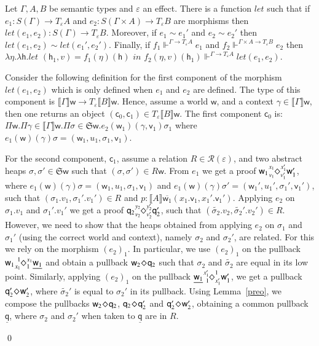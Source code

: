 \documentclass[orivec]{llncs}
\newcommand{\sq}[4]{\tensor*[^{#1}_{#2}]{\Diamond}{^{#3}_{#4}}}
\newcommand{\und}[1]{\underline{#1}}
\newcommand{\eff}{\varepsilon}
\newcommand{\sem}[1]{\ensuremath{\llbracket {#1} \rrbracket}}
\renewenvironment{proof}{\vspace{-1mm} \noindent {\bf Proof}\quad}{\qed}
\newcommand\w{\ensuremath{\mathsf{w}}\xspace}
\newcommand\q{\ensuremath{\mathsf{q}}\xspace}
\newcommand\heap{\ensuremath{\mathsf{h}}\xspace}
\newcommand{\Astores}{\mathfrak{S}}
\newcommand\val{\ensuremath{\mathsf{v}}\xspace}
\newcommand\vval{\ensuremath{v}\xspace}
\newcommand\cval{\ensuremath{\mathsf{c}}\xspace}
\newcommand\Rscr{\ensuremath{\mathcal{R}}\xspace}
\begin{document}
\begin{lemma}[let]
Let $\Gamma,A,B$ be semantic types and $\eff$ an effect. 
There is a function $\textit{let}$ such that if $e_1:S(\Gamma)\rightarrow
T_\eff A$ and $e_2:S(\Gamma\times A)\rightarrow T_\eff B$ are morphisms
then $\textit{let}(e_1,e_2):S(\Gamma)\rightarrow T_\eff B$. Moreover, if
$e_1\sim
e_1'$ and $e_2\sim e_2'$ then $\textit{let}(e_1,e_2)\sim
\textit{let}(e_1',e_2')$. 
Finally, if $f_1\Vdash^{\Gamma\rightarrow T_\eff A} e_1$ and
$f_2\Vdash^{\Gamma\times A\rightarrow T_\eff B} e_2$ then $\lambda \eta.
\lambda \heap.\textit{let } (\heap_1,\vval){=}f_1(\eta)(\heap)\textit{ in }
f_2(\eta,\vval)(\heap_1)\Vdash^{\Gamma\rightarrow T_\eff
A}\textit{let}(e_1,e_2)$. 
\end{lemma}

\begin{proof}
Consider the following definition for the first component of the morphism
$\textit{let}(e_1,e_2)$ which is only defined when ${e_1}$ and
${e_2}$ are defined. The type of this component is $\sem{\Gamma}\w \to
T_\eff \sem{B}\w$. Hence, assume a world $\w$, and a context $\gamma \in
\sem{\Gamma}\w$, then one returns an object $(\cval_0, \cval_1) \in
T_\eff \sem{B}\w$. The first component $\cval_0$ is:
\(
 \Pi \w. \Pi \gamma \in \sem{\Gamma}\w . \Pi \sigma \in \Astores \w.
{e_2}(\w_1)(\gamma,\val_1)\sigma_1
\)
where ${e_1}(\w)(\gamma)\sigma = (\w_1, u_1, \sigma_1, \val_1)$.

For the second component, $\cval_1$, assume a relation $R \in
\Rscr(\eff)$, and two abstract heaps $\sigma, \sigma' \in \Astores \w$
such that $(\sigma, \sigma') \in R\w$. From ${e_1}$ we get a 
proof $\w_1 \sq{x_1}{v_1}{x_1'}{v_1'} \w_1'$, where
${e_1}(\w)(\gamma)\sigma
=
(\w_1, u_1, \sigma_1, \val_1)$ and ${e_1}(\w)(\gamma)\sigma' =
(\w_1', u_1', \sigma_1', \val_1')$, such that $(\sigma_1.v_1,
\sigma_1'.v_1') \in R$ and $p : \sem{A}\overline{\w_1}(x_1.\val_1,
x_1'.\val_1')$. Applying ${e_2}$ on $\sigma_1.v_1$ and
$\sigma_1'.v_1'$ we get a proof $\q_2 \sq{y_2}{v_2}{y_2'}{v_2'} \q_2'$,
such that $(\tilde{\sigma_2}.v_2, \tilde{\sigma_2}'.v_2') \in R$. However,
we need to show that the heaps obtained from applying ${e_2}$ on $\sigma_1$
and $\sigma_1'$ (using the correct world and context), namely $\sigma_2$
and $\sigma_2'$, are related. For this we rely on
the morphism $(e_2)_1$. In particular,
we use $(e_2)_1$ on the pullback $\w_1 \sq{1}{x_1}{x_1}{1} \und{\w_1}$ and
obtain a pullback $\w_2 \sq{}{}{}{} \q_2$ such that $\sigma_2$ and
$\tilde{\sigma_2}$
are equal in its low point. Similarly, applying $(e_2)_1$ on the
pullback $\und{\w_1} \sq{x_1'}{1}{1}{x_1'} \w_1'$, we get a pullback 
$\q_2' \sq{}{}{}{} \w_2'$, where $\tilde{\sigma_2}'$ is equal to
$\sigma_2'$ in its pullback. Using Lemma~\ref{preo}, we compose the
pullbacks $\w_2 \sq{}{}{}{} \q_2$, $\q_2 \sq{}{}{}{} \q_2'$ and $\q_2'
\sq{}{}{}{} \w_2'$, obtaining a common pullback $\und{\q}$, where 
$\sigma_2$ and $\sigma_2'$ when taken to $\und{\q}$ are in $R$. 


\end{proof}
\end{document}
